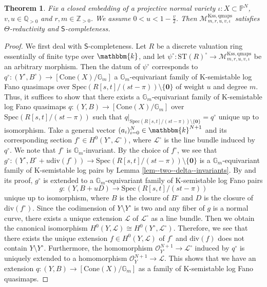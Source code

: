 \documentclass[12pt,twoside]{amsart}
\newtheorem{thm}{Theorem}[section]
\theoremstyle{definition}
\begin{document}
\begin{thm}\label{thm--s-complete}
Fix a closed embedding of a projective normal variety $\iota\colon X\subset \mathbb{P}^N$, $v,u\in\mathbb{Q}_{>0}$ and $r,m\in\mathbb{Z}_{>0}$.
We assume $0<u<1-\frac{v}{2}$.  
Then $\mathcal{M}^{\mathrm{Kss,qmaps}}_{m,r,u,v,\iota}$ satisfies $\Theta$-reductivity and $\mathsf{S}$-completeness.
\end{thm}

\begin{proof}
    We first deal with $\mathsf{S}$-completeness.
    Let $R$ be a discrete valuation ring essentially of finite type over $\mathbbm{k}$, and let $\psi^\circ\colon \mathrm{ST}(R)^\circ\to \mathcal{M}^{\mathrm{Kss,qmaps}}_{m,r,u,v,\iota}$ be an arbitrary morphism. 
    Then the datum of $\psi^\circ$ corresponds to $q^\circ\colon (Y^{\circ},B^\circ)\to[\mathrm{Cone}(X)/\mathbb{G}_m]$ a $\mathbb{G}_m$-equivariant family of K-semistable log Fano quasimaps over $\mathrm{Spec}(R[s,t]/(st-\pi))\setminus\{\mathbf{0}\}$ of weight $u$ and degree $m$.
    Thus, it suffices to show that there exists a $\mathbb{G}_m$-equivariant family of K-semistable log Fano quasimaps $q\colon (Y,B)\to[\mathrm{Cone}(X)/\mathbb{G}_m]$ over $\mathrm{Spec}(R[s,t]/(st-\pi))$ such that $q|_{\mathrm{Spec}(R[s,t]/(st-\pi))\setminus\{\mathbf{0}\}}=q^\circ$ unique up to isomorphism.
    Take a general vector $(a_i)_{i=0}^{N}\in\mathbbm{k}^{N+1}$ and its corresponding section $f^\circ\in H^0(Y^\circ,\mathscr{L}^\circ)$, where $\mathscr{L}^\circ$ is the line bundle induced by $q^\circ$.
    We note that $f^\circ$ is $\mathbb{G}_m$-invariant.
    By the choice of $f^\circ$, we see that $g^\circ\colon(Y^{\circ},B^\circ+u\mathrm{div}(f^\circ))\to \mathrm{Spec}(R[s,t]/(st-\pi))\setminus\{\mathbf{0}\}$ is a $\mathbb{G}_m$-equivariant family of K-semistable log pairs by Lemma \ref{lem--two--delta--invariants}. 
    By \cite[Theorem 3.3]{ABHLX} and its proof, $g^\circ$ is extended to a $\mathbb{G}_m$-equivariant family of K-semistable log Fano pairs
    \[
    g\colon(Y,B+uD)\to \mathrm{Spec}(R[s,t]/(st-\pi))
    \]
     unique up to isomorphism, where $B$ is the closure of $B^\circ$ and $D$ is the closure of $\mathrm{div}(f^\circ)$.
    Since the codimension of $Y\setminus Y^\circ$ is two and any fiber of $g$ is a normal curve, there exists a unique extension $\mathscr{L}$ of $\mathscr{L}^\circ$ as a line bundle.
    Then we obtain the canonical isomorphism $H^0(Y,\mathscr{L})\cong H^0(Y^\circ,\mathscr{L}^\circ)$.
    Therefore, we see that there exists the unique extension $f\in H^0(Y,\mathscr{L})$ of $f^\circ$ and $\mathrm{div}(f)$ does not contain $Y\setminus Y^\circ$.
    Furthermore, the homomorphism $\mathcal{O}_{Y^\circ}^{N+1}\to \mathscr{L}^\circ$ induced by $q^\circ$ is uniquely extended to a homomorphism $\mathcal{O}_{Y}^{N+1}\to \mathscr{L}$.
    This shows that we have an extension $q\colon (Y,B)\to[\mathrm{Cone}(X)/\mathbb{G}_m]$ as a family of K-semistable log Fano quasimaps.


\end{proof}
\end{document}
